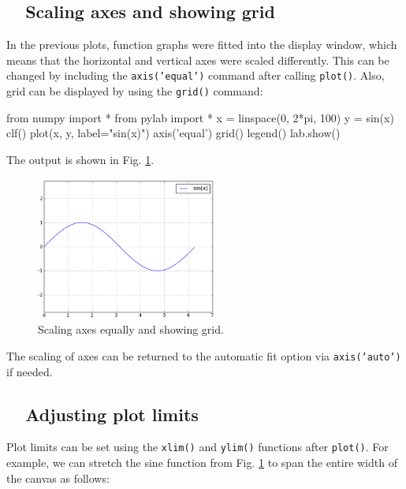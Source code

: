 \subsection{\ \ Scaling axes and showing grid}

In the previous plots, function graphs were fitted into the 
display window, which means that the horizontal and vertical 
axes were scaled differently. This can be changed by including the 
{\tt axis('equal')} command after calling {\tt plot()}. Also, 
grid can be displayed by using the {\tt grid()} command:

\begin{bluecode}
from numpy import *
from pylab import *
x = linspace(0, 2*pi, 100)
y = sin(x)
clf()
plot(x, y, label="sin(x)")
axis('equal')
grid()
legend()
lab.show()
\end{bluecode}
\noindent
The output is shown in Fig. \ref{fig:plot8}.
\newpage

\begin{figure}[!ht]
\begin{center}
\includegraphics[width=0.53\textwidth]{imgp/plot8.png}
\end{center}
\vspace{-4mm}
\caption{Scaling axes equally and showing grid.}
\label{fig:plot8}
\vspace{-2mm}
\end{figure}
\noindent
The scaling of axes can be returned to the automatic fit option via
{\tt axis('auto')} if needed.

\subsection{\ \ Adjusting plot limits}

Plot limits can be set using the {\tt xlim()} and {\tt ylim()}
functions after {\tt plot()}. For example, we can stretch the sine
function from Fig. \ref{fig:plot8} to span the entire width of the 
canvas as follows:

